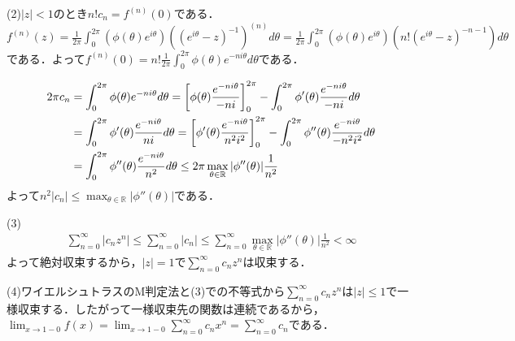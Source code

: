\documentclass[
		book,
		head_space=20mm,
		foot_space=20mm,
		gutter=10mm,
		line_length=190mm
]{jlreq}
\begin{document}
(2)$|z|<1$のとき$n!c_n=f^{(n)}(0)$である．
$f^{(n)}(z)=\frac{1}{2\pi}\int_0^{2\pi}(\phi(\theta)e^{i\theta})((e^{i\theta}-z)^{-1})^{(n)}d\theta=\frac{1}{2\pi}\int_0^{2\pi}(\phi(\theta)e^{i\theta})(n!(e^{i\theta}-z)^{-n-1})d\theta$である．よって$f^{(n)}(0)=n!\frac{1}{2\pi}\int_0^{2\pi} \phi(\theta)e^{-ni\theta}d\theta $である．

\begin{align}
	2\pi c_n&=\int_0^{2\pi} \phi(\theta)e^{-ni\theta}d\theta = \qty[\phi(\theta)\frac{e^{-ni\theta}}{-ni}]_0^{2\pi}-\int_0^{2\pi} \phi'(\theta)\frac{e^{-ni\theta}}{-ni}d\theta\\
	&=\int_0^{2\pi} \phi'(\theta)\frac{e^{-ni\theta}}{ni}d\theta = \qty[\phi'(\theta)\frac{e^{-ni\theta}}{n^2i^2}]_0^{2\pi}-\int_0^{2\pi} \phi''(\theta)\frac{e^{-ni\theta}}{-n^2i^2}d\theta\\
	&=\int_0^{2\pi} \phi''(\theta)\frac{e^{-ni\theta}}{n^2}d\theta\le 2\pi \max_{\theta \in \mathbb{R}}|\phi''(\theta)|\frac{1}{n^2}
\end{align}
よって$n^2|c_n|\le \max_{\theta \in \mathbb{R}}|\phi''(\theta)|$である．

(3)\begin{align}
	\sum_{n=0}^\infty |c_nz^n|\le\sum_{n=0}^\infty |c_n|\le \sum_{n=0}^\infty \max_{\theta \in \mathbb{R}}|\phi''(\theta)|\frac{1}{n^2}<\infty
\end{align}
よって絶対収束するから，$|z|=1$で$\sum\limits_{n=0}^\infty c_nz^n$は収束する．

(4)ワイエルシュトラスのM判定法と(3)での不等式から$\sum\limits_{n=0}^\infty c_nz^n$は$|z|\le 1$で一様収束する．したがって一様収束先の関数は連続であるから，$\lim_{x\rightarrow 1-0}f(x)=\lim_{x\rightarrow 1-0}\sum\limits_{n=0}^\infty c_nx^n=\sum\limits_{n=0}^\infty c_n$である．
\end{document}
